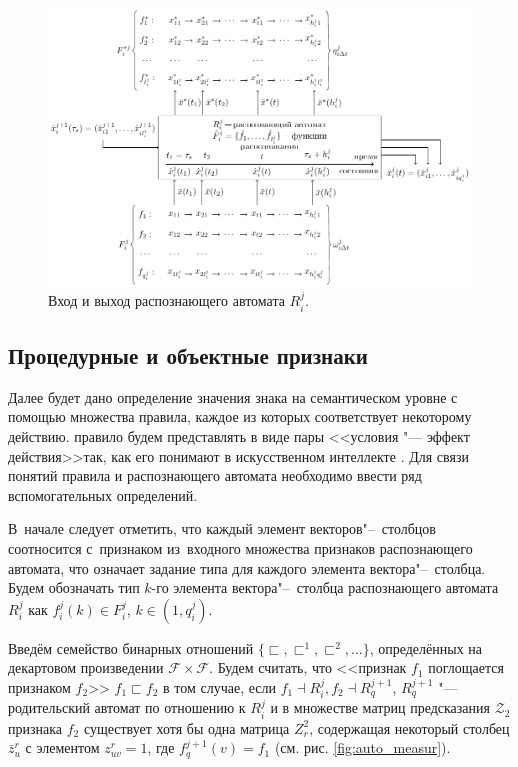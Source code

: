 \documentclass[a4paper, 12pt]{article}
\theoremstyle{plain}
\begin{document}
	\begin{figure}[h]
		\centering
		\includegraphics[width=1.0\linewidth]{rb_io}
		\caption{Вход и выход распознающего автомата $R_i^j$.}
		\label{fig:rb_io}
	\end{figure}

	\subsection{Процедурные и объектные признаки}
	Далее будет дано определение значения знака на семантическом уровне с помощью множества правила, каждое из которых соответствует некоторому действию. правило будем представлять в виде пары <<условия "--- эффект действия>>так, как его понимают в искусственном интеллекте \cite{Nilson1985}. Для связи понятий правила и распознающего автомата необходимо ввести ряд вспомогательных определений. 

	В~начале следует отметить, что каждый элемент векторов"--~столбцов соотносится с~признаком из~входного множества признаков распознающего автомата, что означает задание типа для каждого элемента вектора"--~столбца. Будем обозначать тип $k$-го элемента вектора"--~столбца распознающего автомата $R_i^j$ как $f_i^j(k)\in F_i^j$, $k\in(1,q_i^j)$. 
	
	Введём семейство бинарных отношений $\{\sqsubset,\sqsubset^1,\sqsubset^2,\dots\}$, определённых на декартовом произведении $\mathcal F\times \mathcal F$. Будем считать, что <<признак $f_1$ поглощается признаком $f_2$>> $f_1\sqsubset f_2$ в том случае, если $f_1\dashv R_i^j, f_2\dashv R_q^{j+1}$, $R_q^{j+1}$ "--- родительский автомат по отношению к $R_i^j$ и в множестве матриц предсказания $\mathcal Z_2$ признака $f_2$ существует хотя бы одна матрица $Z_r^2$, содержащая некоторый столбец $\bar z_u^r$ с элементом $z_{uv}^r=1$, где $f_q^{j+1}(v)=f_1$ (см. рис. \ref{fig:auto_measur}).
		
\end{document}
